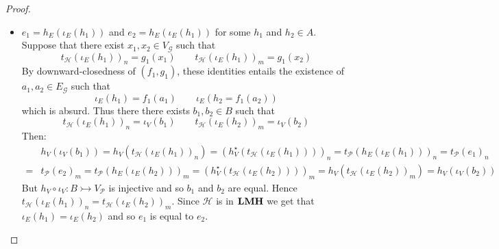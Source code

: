 \documentclass[3p]{elsarticle}
\newcommand{\catname}[1]{\textbf{\textup{#1}}}
\newcommand{\lmo}{\catname{LMH}}
\newcommand{\mto}{\rightarrowtail}
\theoremstyle{remark}
\theoremstyle{definition}
\begin{document}
\begin{proof}
\begin{itemize}
	\item $e_1=h_E(\iota_E(h_1))$ and $e_2=h_E(\iota_E(h_1))$ for some $h_1$ and $h_2\in A$.  Suppose that there exist $x_1, x_2\in V_{\mathcal{G}}$ such that
	\[t_{\mathcal{H}}(\iota_E(h_1))_n = g_1(x_1) \qquad t_{\mathcal{H}}(\iota_E(h_1))_m = g_1(x_2)\]
	By downward-closedness of $(f_1, g_1)$, these identities entails the existence of $a_1, a_2\in E_{\mathcal{G}}$ such that 
	\[\iota_E(h_1)=f_1(a_1) \qquad \iota_E(h_2 = f_1(a_2))\]
	which is absurd. Thus there there exists $b_1, b_2\in B$ such that
	\[t_{\mathcal{H}}(\iota_E(h_1))_n=\iota_V(b_1) \qquad t_{\mathcal{H}}(\iota_E(h_2))_m=\iota_V(b_2)\]
	Then:
	\begin{align*}
	&h_V(\iota_V(b_1))=h_V(t_{\mathcal{H}}(\iota_E(h_1))_n)=(h^\star_V(t_{\mathcal{H}}(\iota_E(h_1))))_n=t_{\mathcal{P}}(h_E(\iota_E(h_1)))_n=t_{\mathcal{P}}(e_1)_n\\=&t_{\mathcal{P}}(e_2)_m=t_{\mathcal{P}}(h_E(\iota_E(h_2)))_m=(h^\star_V(t_{\mathcal{H}}(\iota_E(h_2))))_m=h_V(t_{\mathcal{H}}(\iota_E(h_2))_m)=h_V(\iota_V(b_2))
	\end{align*}
	But $h_V\circ \iota_V\colon B\mto V_{\mathcal{P}}$ is injective and so $b_1$ and $b_2$ are equal. Hence $t_{\mathcal{H}}(\iota_E(h_1))_n = t_{\mathcal{H}}(\iota_E(h_2))_m$. Since $\mathcal{H}$ is in $\lmo$ we get that $\iota_E(h_1)=\iota_E(h_2)$ and so $e_1$ is equal to $e_2$.
	\qedhere 
\end{itemize}
\end{proof}
\end{document}
